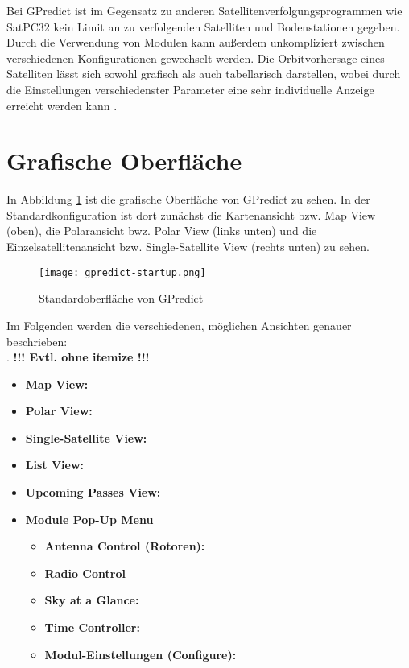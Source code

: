 \clearpage

Bei GPredict ist im Gegensatz zu anderen Satellitenverfolgungsprogrammen wie SatPC32 kein Limit an zu verfolgenden Satelliten und Bodenstationen gegeben. Durch die Verwendung von Modulen kann außerdem unkompliziert zwischen verschiedenen Konfigurationen gewechselt werden. Die Orbitvorhersage eines Satelliten lässt sich sowohl grafisch als auch tabellarisch darstellen, wobei durch die Einstellungen verschiedenster Parameter eine sehr individuelle Anzeige erreicht werden kann \cite{gpredictsource}.

\section{Grafische Oberfläche}

In Abbildung \ref{fig:gpredictstartup} ist die grafische Oberfläche von GPredict zu sehen. In der Standardkonfiguration ist dort zunächst die Kartenansicht bzw. Map View (oben), die Polaransicht bwz. Polar View (links unten) und die Einzelsatellitenansicht bzw. Single-Satellite View (rechts unten) zu sehen.

\begin{figure}[h]
	\centering
	\texttt{[image: gpredict-startup.png]}
	\caption{Standardoberfläche von GPredict}
	\label{fig:gpredictstartup} 
\end{figure}

\clearpage

Im Folgenden werden die verschiedenen, möglichen Ansichten genauer beschrieben:\\
. \hspace{3cm}\textbf{!!! Evtl. ohne itemize !!!}

\begin{itemize}
	\parskip0pt
	\item \textbf{Map View:}
	\item \textbf{Polar View:}
	\item \textbf{Single-Satellite View:}
	\item \textbf{List View:}
	\item \textbf{Upcoming Passes View:}
	\item \textbf{Module Pop-Up Menu}
	\begin{itemize}	
		\item \textbf{Antenna Control (Rotoren):}
		\item \textbf{Radio Control}
		\item \textbf{Sky at a Glance:}
		\item \textbf{Time Controller:}
		\item \textbf{Modul-Einstellungen (Configure):}
	\end{itemize}
\end{itemize}

